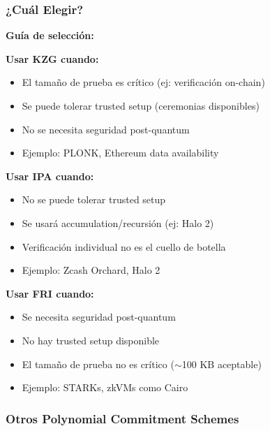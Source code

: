 \documentclass[11pt,a4paper,twoside,openright]{book}
\theoremstyle{definition}
\theoremstyle{plain}
\theoremstyle{remark}
\begin{document}
\subsubsection{¿Cuál Elegir?}

\begin{keyidea}
\textbf{Guía de selección:}

\textbf{Usar KZG cuando:}
\begin{itemize}
    \item El tamaño de prueba es crítico (ej: verificación on-chain)
    \item Se puede tolerar trusted setup (ceremonias disponibles)
    \item No se necesita seguridad post-quantum
    \item Ejemplo: PLONK, Ethereum data availability
\end{itemize}

\textbf{Usar IPA cuando:}
\begin{itemize}
    \item No se puede tolerar trusted setup
    \item Se usará accumulation/recursión (ej: Halo 2)
    \item Verificación individual no es el cuello de botella
    \item Ejemplo: Zcash Orchard, Halo 2
\end{itemize}

\textbf{Usar FRI cuando:}
\begin{itemize}
    \item Se necesita seguridad post-quantum
    \item No hay trusted setup disponible
    \item El tamaño de prueba no es crítico ($\sim$100 KB aceptable)
    \item Ejemplo: STARKs, zkVMs como Cairo
\end{itemize}
\end{keyidea}

\subsubsection{Otros Polynomial Commitment Schemes}
\end{document}
